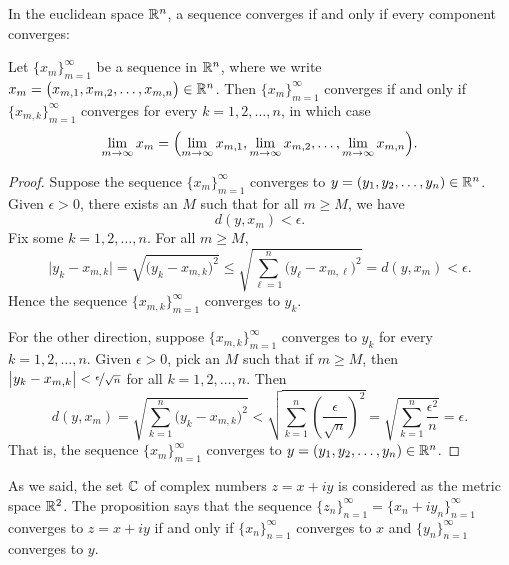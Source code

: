 In the euclidean space ${\mathbb{R}}^n$, a sequence converges if and only if every
component converges:

\begin{prop} \label{prop:msconveuc}
Let $\{ x_m \}_{m=1}^\infty$ be a sequence in ${\mathbb{R}}^n$,
where we write $x_m = \bigl(x_{m,1},x_{m,2},\ldots,x_{m,n}\bigr) \in {\mathbb{R}}^n$.
Then $\{ x_m \}_{m=1}^\infty$ converges if and only if
$\{ x_{m,k} \}_{m=1}^\infty$ converges for every $k=1,2,\ldots,n$, in which case
\begin{equation*}
\lim_{m\to\infty}
x_m =
\Bigl(
\lim_{m\to\infty} x_{m,1},
\lim_{m\to\infty} x_{m,2},
\ldots,
\lim_{m\to\infty} x_{m,n}
\Bigr) .
\end{equation*}
\end{prop}

\begin{proof}
Suppose
the sequence
$\{ x_m \}_{m=1}^\infty$ converges to
$y = (y_1,y_2,\ldots,y_n) \in {\mathbb{R}}^n$.
Given $\epsilon > 0$, there exists an $M$ such that for all
$m \geq M$, we have
\begin{equation*}
d(y,x_m) < \epsilon.
\end{equation*}
Fix some $k=1,2,\ldots,n$.  For all $m \geq M$,
\begin{equation*}
\bigl\lvert y_k - x_{m,k} \bigr\rvert
=
\sqrt{{\bigl(y_k - x_{m,k} \bigr)}^2}
\leq
\sqrt{\sum_{\ell=1}^n {\bigl(y_\ell-x_{m,\ell}\bigr)}^2}
= d(y,x_m) < \epsilon .
\end{equation*}
Hence the sequence $\{ x_{m,k} \}_{m=1}^\infty$ converges to $y_k$.

For the other direction, suppose 
$\{ x_{m,k} \}_{m=1}^\infty$ converges to $y_k$ for every $k=1,2,\ldots,n$.
Given $\epsilon > 0$, pick an $M$ such that if $m \geq M$, then 
$\bigl\lvert y_k-x_{m,k} \bigr\rvert < \nicefrac{\epsilon}{\sqrt{n}}$ for all
$k=1,2,\ldots,n$.  Then
\begin{equation*}
d(y,x_m)
=
\sqrt{\sum_{k=1}^n {\bigl(y_k-x_{m,k}\bigr)}^2}
<
\sqrt{\sum_{k=1}^n {\left(\frac{\epsilon}{\sqrt{n}}\right)}^2}
=
\sqrt{\sum_{k=1}^n \frac{{\epsilon^2}}{n}}
= \epsilon .
\end{equation*}
That is, the sequence $\{ x_m \}_{m=1}^\infty$ converges to
$y = (y_1,y_2,\ldots,y_n) \in {\mathbb{R}}^n$.
\end{proof}

\begin{example}
As we said, the set ${\mathbb{C}}$ of complex numbers $z = x+iy$ is considered 
as the metric space ${\mathbb{R}}^2$.  The proposition says that the
sequence $\{ z_n \}_{n=1}^\infty = \{ x_n + iy_n \}_{n=1}^\infty$ converges
to $z = x+iy$
if and only if $\{ x_n \}_{n=1}^\infty$ converges to $x$ and 
$\{ y_n \}_{n=1}^\infty$ converges to $y$.
\end{example}

